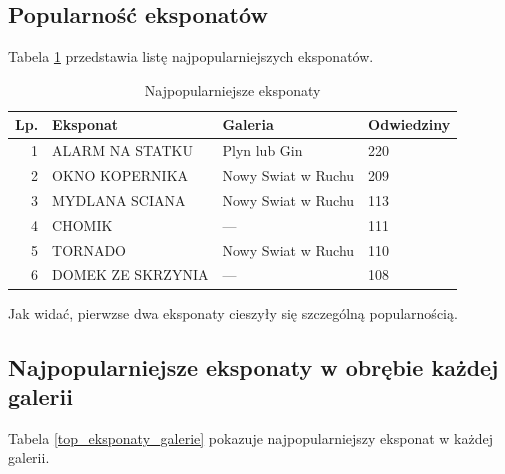 \documentclass[conference]{IEEEtran}
\begin{document}
\subsection{Popularność eksponatów}
Tabela \ref{top_eksponaty} przedstawia listę najpopularniejszych eksponatów.
\begin{table}[H]
\caption{Najpopularniejsze eksponaty}
\label{top_eksponaty}
\centering
\begin{tabular}{|r|l|l|l|}
\hline
\textbf{Lp.} & \textbf{Eksponat} & \textbf{Galeria} & \textbf{Odwiedziny} \\
\hline
 1 &   ALARM NA STATKU  &     Plyn lub Gin     &         220 \\
 2 &   OKNO KOPERNIKA & Nowy Swiat w Ruchu    &          209 \\
 3 &   MYDLANA SCIANA & Nowy Swiat w Ruchu   &           113 \\
 4 &           CHOMIK  &           ---    &          111 \\
 5 &          TORNADO & Nowy Swiat w Ruchu    &          110 \\
 6 & DOMEK ZE SKRZYNIA  &           ---   &          108 \\
\hline
\end{tabular}
\end{table}
Jak widać, pierwzse dwa eksponaty cieszyły się szczególną popularnością.
\subsection{Najpopularniejsze eksponaty w obrębie każdej galerii}
Tabela \ref{top_eksponaty_galerie} pokazuje najpopularniejszy eksponat w każdej galerii.
\end{document}
